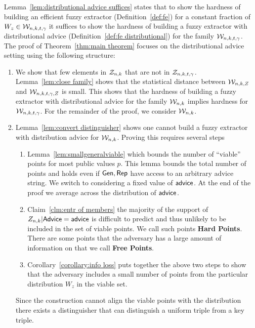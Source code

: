 Lemma~\ref{lem:distributional advice suffices} states that to show the hardness of building an efficient fuzzy extractor (Definition~\ref{def:fe}) for a constant fraction of $W_z\in \mathcal{W}_{n,k,t,\gamma}$ it suffices to show the hardness of building a fuzzy extractor with distributional advice (Definition~\ref{def:fe distributional}) for the family $\mathcal{W}_{n,k,t,\gamma}$. The proof of Theorem~\ref{thm:main theorem} focuses on the distributional advice setting using the following structure:
\begin{enumerate}

\item We show that few elements in $\mathcal{Z}_{n,k}$ that are not in $\mathcal{Z}_{n,k,t,\gamma}$. Lemma~\ref{lem:close family} shows that the statistical distance between $\mathcal{W}_{n,k, Z}$ and $\mathcal{W}_{n,k,t,\gamma, Z}$ is small.  This shows that the hardness of building a fuzzy extractor with distributional advice for the family $\mathcal{W}_{n,k}$ implies hardness for $\mathcal{W}_{n,k,t,\gamma}$. For the remainder of the proof, we consider $\mathcal{W}_{n,k}$.
\item Lemma~\ref{lem:convert distinguisher} shows one cannot build a fuzzy extractor with distribution advice for $\mathcal{W}_{n,k}$. Proving this requires several steps
\begin{enumerate}
\item Lemma~\ref{lem:smallgeneralviable} which bounds the number of ``viable'' points for most public values $p$.  This lemma bounds the total number of points and holds even if ${\mathsf{Gen}}, {\mathsf{Rep}}$ have access to an arbitrary advice string. We switch to considering a fixed value of ${\mathsf{advice}}$.  At the end of the proof we average across the distribution of ${\mathsf{advice}}$.

\item Claim~\ref{clm:entr of members} the majority of the support of $Z_{n,k} | {\mathsf{Advice}} = {\mathsf{advice}}$ is difficult to predict and thus unlikely to be included in the set of viable points. We call such points \textbf{Hard Points}.  There are some points that the adversary has a large amount of information on that we call \textbf{Free Points}.

\item Corollary~\ref{corollary:info loss} puts together the above two steps to show that the adversary includes a small number of points from the particular distribution $W_z$ in the viable set. 

\end{enumerate}

Since the construction cannot align the viable points with the distribution there exists a distinguisher that can distinguish a uniform triple from a key triple. 
\end{enumerate}

